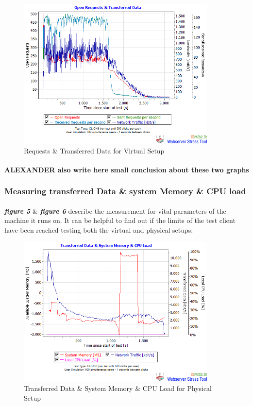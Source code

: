  
\begin{figure}[H]
    \centering
    \includegraphics[width=10cm]{Pictures/graph6vm.png}
    \caption{Requests \& Transferred Data for Virtual Setup}
    \label{fig:QQ3}
\end{figure} 


\paragraph{}
\textbf{ALEXANDER also write here small conclusion about these two graphs}

\subsubsection{Measuring transferred Data \& system Memory \& CPU load}
\paragraph{}

\textbf{\textit{figure 5}} \& \textbf{\textit{figure 6}} describe the measurement for vital parameters of the machine it runs on. It can be helpful to find out if the limits of the test client have been reached testing both the virtual and physical setups:

 \begin{figure}[H]
    \centering
    \includegraphics[width=10cm]{Pictures/ph1.png}
    \caption{Transferred Data \& System Memory \& CPU Load for Physical Setup}
    \label{fig:QQ3}
\end{figure}
   
